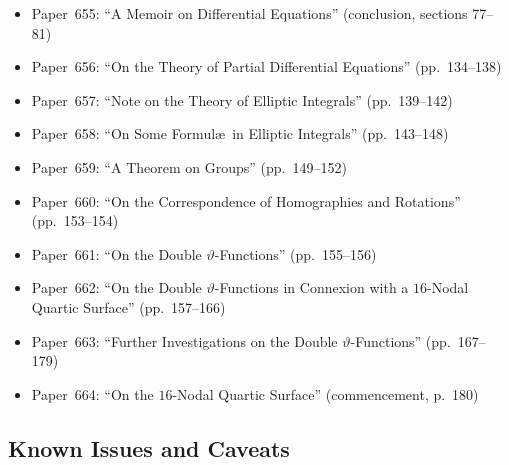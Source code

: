 \documentclass[11pt,a4paper]{book}
\begin{document}
\begin{itemize}[leftmargin=2em]
\item Paper~655: ``A Memoir on Differential Equations'' (conclusion, sections 77--81)
\item Paper~656: ``On the Theory of Partial Differential Equations'' (pp.~134--138)
\item Paper~657: ``Note on the Theory of Elliptic Integrals'' (pp.~139--142)
\item Paper~658: ``On Some Formul\ae\ in Elliptic Integrals'' (pp.~143--148)
\item Paper~659: ``A Theorem on Groups'' (pp.~149--152)
\item Paper~660: ``On the Correspondence of Homographies and Rotations'' (pp.~153--154)
\item Paper~661: ``On the Double $\vartheta$-Functions'' (pp.~155--156)
\item Paper~662: ``On the Double $\vartheta$-Functions in Connexion with a $16$-Nodal Quartic Surface'' (pp.~157--166)
\item Paper~663: ``Further Investigations on the Double $\vartheta$-Functions'' (pp.~167--179)
\item Paper~664: ``On the $16$-Nodal Quartic Surface'' (commencement, p.~180)
\end{itemize}

\subsection*{Known Issues and Caveats}
\end{document}
